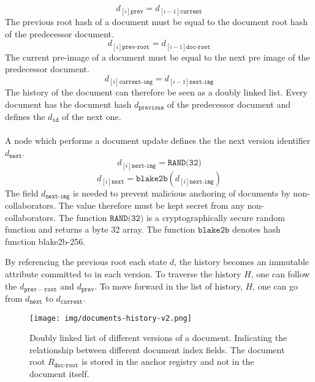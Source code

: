 \begin{equation}
d_{[i]\texttt{prev}} = d_{[i-1]\texttt{current}} 
\end{equation}
\newline
The previous root hash of a document must be equal to the document root hash of the predecessor document.
\begin{equation}
d_{[i]\texttt{prev-root}} = d_{[i-1]\texttt{doc-root}}
\end{equation}
\newline
The current pre-image of a document must be equal to the next pre image of the predecessor document.
\begin{equation}
d_{[i]\texttt{current-img}} = d_{[i-1]\texttt{next-img}}
\end{equation}
\newline
The history of the document can therefore be seen as a doubly linked list. Every document has the document hash $d_{\texttt{previous}}$ of the predecessor document and defines the $d_{\texttt{id}}$ of the next one.\\\\
A node which performs a document update defines the the next version identifier $d_{\texttt{next}}$.
\begin{equation}
d_{[i]\texttt{next-img}} = \texttt{RAND(32)}
\end{equation}
\begin{equation}
d_{[i]\texttt{next}} = \mathtt{blake2b}(d_{[i]\texttt{next-img}})
\end{equation}
\newline
The field $d_{\texttt{next-img}}$ is needed to prevent malicious anchoring of documents by non-collaborators. The value therefore must be kept secret from any non-collaborators. The function $\texttt{RAND(32)}$ is a cryptographically secure random function and returns a byte 32 array. The function $\mathtt{blake2b}$ denotes hash function blake2b-256. 

By referencing the previous root each state $d$, the history becomes an immutable attribute committed to in each version. To traverse the history $H$, one can follow the $d_{\mathtt{prev-root}}$ and $d_{\mathtt{prev}}$. To move forward in the list of history, $H$, one can go from $d_{\mathtt{next}}$ to $d_{\mathtt{current}}$.
\begin{figure}[thpb]
  \centering
  \texttt{[image: img/documents-history-v2.png]}
  \caption{Doubly linked list of different versions of a document. Indicating the relationship between different document index fields. The document root $R_{\texttt{doc-root}}$ is stored in the anchor registry and not in the document itself.} 
  \label{fig:documents}
\end{figure}

